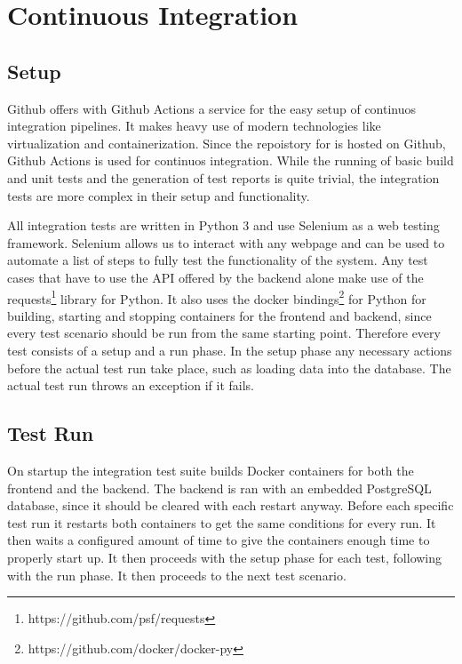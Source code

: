 \section{Continuous Integration}

\subsection{Setup}
Github offers with Github Actions a service for the easy setup of continuos integration pipelines. It makes heavy use of modern technologies like virtualization and containerization. Since the repoistory for \parkview{} is hosted on Github, Github Actions is used for continuos integration. While the running of basic build and unit tests and the generation of test reports is quite trivial, the integration tests are more complex in their setup and functionality. 

All integration tests are written in Python 3 and use Selenium as a web testing framework. Selenium allows us to interact with any webpage and can be used to automate a list of steps to fully test the functionality of the system. Any test cases that have to use the API offered by the backend alone make use of the requests\footnote{https://github.com/psf/requests} library for Python. It also uses the docker bindings\footnote{https://github.com/docker/docker-py} for Python for building, starting and stopping containers for the frontend and backend, since every test scenario should be run from the same starting point. Therefore every test consists of a setup and a run phase. In the setup phase any necessary actions before the actual test run take place, such as loading data into the database. The actual test run throws an exception if it fails.

\subsection{Test Run}
On startup the integration test suite builds Docker containers for both the frontend and the backend. The backend is ran with an embedded PostgreSQL database, since it should be cleared with each restart anyway. Before each specific test run it restarts both containers to get the same conditions for every run. It then waits a configured amount of time to give the containers enough time to properly start up. It then proceeds with the setup phase for each test, following with the run phase. It then proceeds to the next test scenario.

